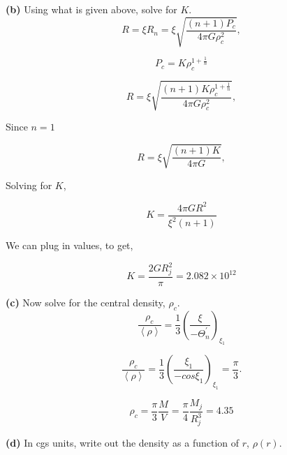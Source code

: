 \documentclass[12pt]{article}
\begin{document}
\noindent \textbf{(b)} Using what is given above, solve for $K$. \\

\begin{equation}
R = \xi R_{n} = \xi \sqrt{\frac{\left( n + 1\right)P_c}{4\pi G\rho_c^2}},
\end{equation}

\begin{equation}
P_c = K \rho_c^{1 + \frac{1}{n}}
\end{equation}
  
\begin{equation}
R = \xi \sqrt{\frac{\left( n + 1\right)K  \rho_c^{1 + \frac{1}{n}}}{4\pi G\rho_c^2}},
\end{equation}

\noindent Since $n=1$

\begin{equation}
R = \xi \sqrt{\frac{\left( n + 1\right)K }{4\pi G}},
\end{equation}
  
\noindent Solving for $K$, 

\begin{equation}
K = \frac{4\pi G R^2}{\xi^2 \left( n+1\right)}
\end{equation}
  
\noindent We can plug in values, to get, 

\begin{equation}
K = \frac{2 G R_j^2}{\pi } = 2.082 \times 10^{12}
\end{equation}

\noindent \textbf{(c)} Now solve for the central density, $\rho_c$. \\

\begin{equation}
\frac{\rho_c}{\left< \rho \right>} = \frac{1}{3}\left( \frac{\xi}{-\Theta^{'}_n}\right)_{\xi_1}
\end{equation}

\begin{equation}
\frac{\rho_c}{\left< \rho \right>} = \frac{1}{3}\left( \frac{\xi_1}{-cos \xi_1}\right)_{\xi_1} = \frac{\pi}{3}.
\end{equation}

\begin{equation}
\rho_c = \frac{\pi}{3}\frac{M}{V} = \frac{\pi}{4}\frac{M_j}{R_j^3} =  4.35
\end{equation}

\noindent \textbf{(d)} In cgs units, write out the density as a function of $r$, $\rho\left( r\right)$.\\
\end{document}
